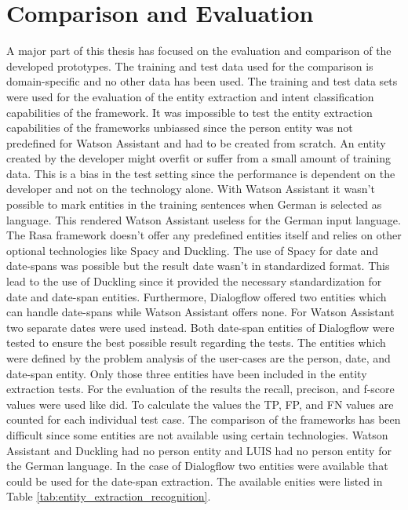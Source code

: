 \section{Comparison and Evaluation}
A major part of this thesis has focused on the evaluation and comparison of the 
developed prototypes.
The training and test data used for the comparison is domain-specific and no other 
data has been used.
The training and test data sets were used for the evaluation of the entity extraction and 
intent classification capabilities of the framework.
It was impossible to test the entity extraction capabilities of the frameworks unbiassed since 
the person entity was not predefined for Watson Assistant and had to be created from scratch.
An entity created by the developer might overfit or suffer from a small amount of training data.
This is a bias in the test setting since the performance is dependent on the developer and not 
on the technology alone.
With Watson Assistant it wasn't possible to mark entities in the training sentences when 
German is selected as language.
This rendered Watson Assistant useless for the German input language.  
The Rasa framework doesn't offer any predefined entities itself and relies on other 
optional technologies like Spacy and Duckling.
The use of Spacy for date and date-spans was possible but the result date wasn't in standardized 
format.
This lead to the use of Duckling since it provided the necessary standardization for date and 
date-span entities.
Furthermore, Dialogflow offered two entities which can handle date-spans while Watson Assistant offers none.
For Watson Assistant two separate dates were used instead.
Both date-span entities of Dialogflow were tested to ensure the best possible result regarding the tests.
The entities which were defined by the problem analysis of the user-cases are the person, date, and date-span entity.
Only those three entities have been included in the entity extraction tests.
For the evaluation of the results the recall, precison, and f-score values were used like \citet{braunEvaluatingNLU} did.
To calculate the values the TP, FP, and FN values are counted for each individual test case.
The comparison of the frameworks has been difficult since some entities are not available using certain technologies.
Watson Assistant and Duckling had no person entity and LUIS had no person entity for the German language.
In the case of Dialogflow two entities were available that could be used for the date-span extraction.
The available enities were listed in Table \ref{tab:entity_extraction_recognition}.
